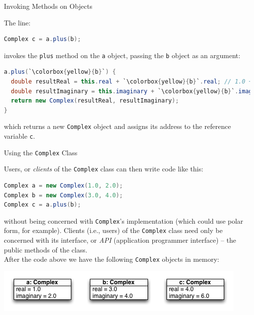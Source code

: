 \documentclass{beamer}
\begin{document}
\begin{frame}[fragile]{Invoking Methods on Objects}


The line:
\begin{lstlisting}[language=Java]
Complex c = a.plus(b);
\end{lstlisting}
invokes the {\tt plus} method on the {\tt a} object, passing the {\tt b} object as an argument:
\begin{lstlisting}[language=Java,escapechar=`]
a.plus(`\colorbox{yellow}{b}`) {
  double resultReal = this.real + `\colorbox{yellow}{b}`.real; // 1.0 + 3.0
  double resultImaginary = this.imaginary + `\colorbox{yellow}{b}`.imaginary; // 2.0 + 4.0
  return new Complex(resultReal, resultImaginary);
}
\end{lstlisting}
which returns a new {\tt Complex} object and assigns its address to the  reference variable {\tt c}.

\end{frame}

\begin{frame}[fragile]{Using the {\tt Complex} Class}


Users, or {\it clients} of the {\tt Complex} class can then write code like this:
\begin{lstlisting}[language=Java]
Complex a = new Complex(1.0, 2.0);
Complex b = new Complex(3.0, 4.0);
Complex c = a.plus(b);
\end{lstlisting}

without being concerned with {\tt Complex}'s implementation (which could use polar form, for example).  Clients (i.e., users) of the {\tt Complex} class need only be concerned with its interface, or {\it API} (application programmer interface) -- the public methods of the class.\\
\vspace{.1in}
After the code above we have the following {\tt Complex} objects in memory:
\begin{center}
\includegraphics[height=.7in]{complex-abc.png}
\end{center}

\end{frame}









\end{document}
